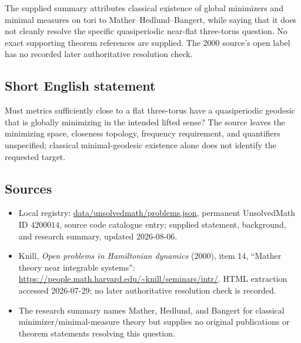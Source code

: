\documentclass[11pt]{article}
\begin{document}
The supplied summary attributes classical existence of global minimizers and minimal measures on tori to Mather--Hedlund--Bangert, while saying that it does not cleanly resolve the specific quasiperiodic near-flat three-torus question. No exact supporting theorem references are supplied. The 2000 source's open label has no recorded later authoritative resolution check.
\subsection{Short English statement}
Must metrics sufficiently close to a flat three-torus have a quasiperiodic geodesic that is globally minimizing in the intended lifted sense? The source leaves the minimizing space, closeness topology, frequency requirement, and quantifiers unspecified; classical minimal-geodesic existence alone does not identify the requested target.
\subsection{Sources}
\begin{itemize}
\item Local registry: \url{data/unsolvedmath/problems.json}, permanent UnsolvedMath ID \(4200014\), source code catalogue entry; supplied statement, background, and research summary, updated 2026-08-06.
\item Knill, \emph{Open problems in Hamiltonian dynamics} (2000), item 14, ``Mather theory near integrable systems'': \url{https://people.math.harvard.edu/~knill/seminars/intr/}. HTML extraction accessed 2026-07-29; no later authoritative resolution check is recorded.
\item The research summary names Mather, Hedlund, and Bangert for classical minimizer/minimal-measure theory but supplies no original publications or theorem statements resolving this question.
\end{itemize}
\end{document}
